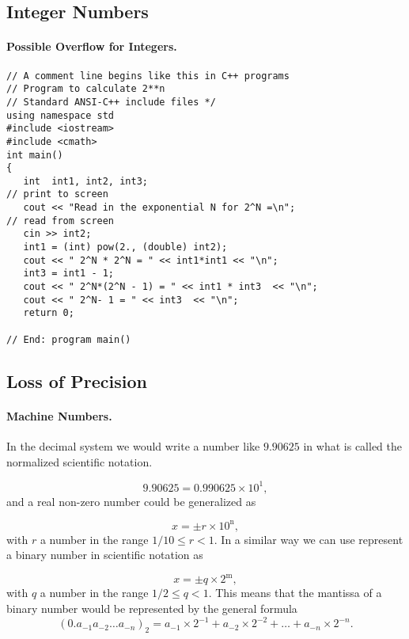 \documentclass[%
oneside,                 %
final,                   %
10pt]{article}
\begin{document}
\subsection*{Integer Numbers}


\paragraph{Possible Overflow for Integers.}
\begin{verbatim}
// A comment line begins like this in C++ programs
// Program to calculate 2**n
// Standard ANSI-C++ include files */
using namespace std
#include <iostream>
#include <cmath>
int main()
{
   int  int1, int2, int3;
// print to screen
   cout << "Read in the exponential N for 2^N =\n";
// read from screen
   cin >> int2;
   int1 = (int) pow(2., (double) int2);
   cout << " 2^N * 2^N = " << int1*int1 << "\n";
   int3 = int1 - 1;
   cout << " 2^N*(2^N - 1) = " << int1 * int3  << "\n";
   cout << " 2^N- 1 = " << int3  << "\n";
   return 0;

// End: program main()
\end{verbatim}



\subsection*{Loss of Precision}


\paragraph{Machine Numbers.}
In the decimal system we would write a number like $9.90625$
in what is called the normalized scientific notation.

\[
  9.90625=0.990625\times 10^{1},
\]
and a real non-zero number could be generalized as

\begin{equation}
    x=\pm r\times 10^{{\mbox{n}}},
\end{equation}
with $r$ a number in the range $1/10 \le r < 1$.
In a similar way we can use represent a binary number in
scientific notation as

\begin{equation}
    x=\pm q\times 2^{{\mbox{m}}},
\end{equation}
with $q$ a number in the range $1/2 \le q < 1$.
This means that the mantissa of a binary number would be represented by
the general formula
\begin{equation}
(0.a_{-1}a_{-2}\dots a_{-n})_2=a_{-1}\times 2^{-1}
+a_{-2}\times 2^{-2}+\dots+a_{-n}\times 2^{-n}.
\end{equation}
\end{document}
